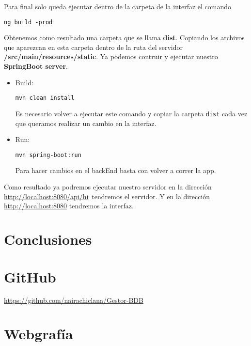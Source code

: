 \documentclass[12pt,a4paper]{article}
\begin{document}
Para final solo queda ejecutar dentro de la carpeta de la interfaz el comando \begin{verbatim}ng build -prod\end{verbatim} 

Obtenemos como resultado una carpeta que se llama \textbf{dist}. Copiando los archivos que aparezcan en esta carpeta dentro de la ruta del servidor \textbf{/src/main/resources/static}. Ya podemos contruir y ejecutar nuestro \textbf{SpringBoot server}.


\begin{itemize}
    \item Build: \begin{verbatim}mvn clean install \end{verbatim}
    Es necesario volver a ejecutar este comando y copiar la carpeta \verb|dist| cada vez que queramos realizar un cambio en la interfaz.
    \item Run: \begin{verbatim}mvn spring-boot:run \end{verbatim}
    Para hacer cambios en el backEnd basta con volver a correr la app.
\end{itemize}

Como resultado ya podremos ejecutar nuestro servidor en la dirección
 \url{http://localhost:8080/api/hi}\, tendremos el servidor. Y en la dirección \url{http://localhost:8080} tendremos la interfaz.






\newpage
\section{Conclusiones} \label{pto9}




\newpage
\section{GitHub} \label{pto10}
\url{https://github.com/nairachiclana/Gestor-BDB}
\section{Webgrafía} \label{pto11}
\end{document}
